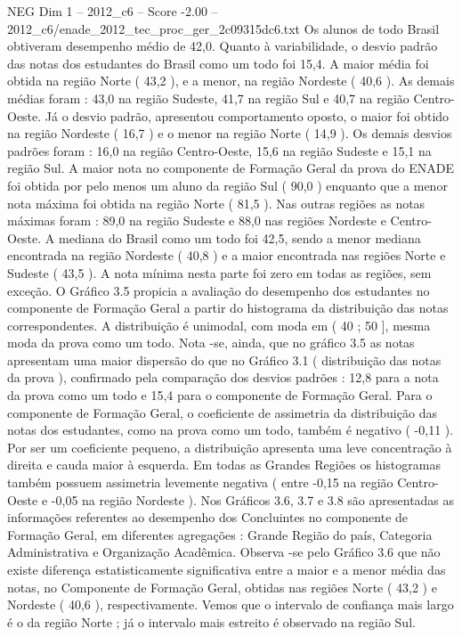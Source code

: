 \begin{textsample}{NEG Dim 1 – 2012\_c6 – Score -2.00 – 2012\_c6/enade\_2012\_tec\_proc\_ger\_2c09315dc6.txt}
Os alunos de todo Brasil obtiveram desempenho médio de 42,0.
Quanto à variabilidade, o desvio padrão das notas dos estudantes do Brasil como um todo foi 15,4.
A maior média foi obtida na região Norte ( 43,2 ), e a menor, na região Nordeste ( 40,6 ).
As demais médias foram : 43,0 na região Sudeste, 41,7 na região Sul e 40,7 na região Centro-Oeste.
Já o desvio padrão, apresentou comportamento oposto, o maior foi obtido na região Nordeste ( 16,7 ) e o menor na região Norte ( 14,9 ).
Os demais desvios padrões foram : 16,0 na região Centro-Oeste, 15,6 na região Sudeste e 15,1 na região Sul.
A maior nota no componente de Formação Geral da prova do ENADE foi obtida por pelo menos um aluno da região Sul ( 90,0 ) enquanto que a menor nota máxima foi obtida na região Norte ( 81,5 ).
Nas outras regiões as notas máximas foram : 89,0 na região Sudeste e 88,0 nas regiões Nordeste e Centro-Oeste.
A mediana do Brasil como um todo foi 42,5, sendo a menor mediana encontrada na região Nordeste ( 40,8 ) e a maior encontrada nas regiões Norte e Sudeste ( 43,5 ).
A nota mínima nesta parte foi zero em todas as regiões, sem exceção.
O Gráfico 3.5 propicia a avaliação do desempenho dos estudantes no componente de Formação Geral a partir do histograma da distribuição das notas correspondentes.
A distribuição é unimodal, com moda em ( 40 ; 50 ], mesma moda da prova como um todo.
Nota -se, ainda, que no gráfico 3.5 as notas apresentam uma maior dispersão do que no Gráfico 3.1 ( distribuição das notas da prova ), confirmado pela comparação dos desvios padrões : 12,8 para a nota da prova como um todo e 15,4 para o componente de Formação Geral.
Para o componente de Formação Geral, o coeficiente de assimetria da distribuição das notas dos estudantes, como na prova como um todo, também é negativo ( -0,11 ).
Por ser um coeficiente pequeno, a distribuição apresenta uma leve concentração à direita e cauda maior à esquerda.
Em todas as Grandes Regiões os histogramas também possuem assimetria levemente negativa ( entre -0,15 na região Centro-Oeste e -0,05 na região Nordeste ).
Nos Gráficos 3.6, 3.7 e 3.8 são apresentadas as informações referentes ao desempenho dos Concluintes no componente de Formação Geral, em diferentes agregações : Grande Região do país, Categoria Administrativa e Organização Acadêmica.
Observa -se pelo Gráfico 3.6 que não existe diferença estatisticamente significativa entre a maior e a menor média das notas, no Componente de Formação Geral, obtidas nas regiões Norte ( 43,2 ) e Nordeste ( 40,6 ), respectivamente.
Vemos que o intervalo de confiança mais largo é o da região Norte ; já o intervalo mais estreito é observado na região Sul.

\end{textsample}
